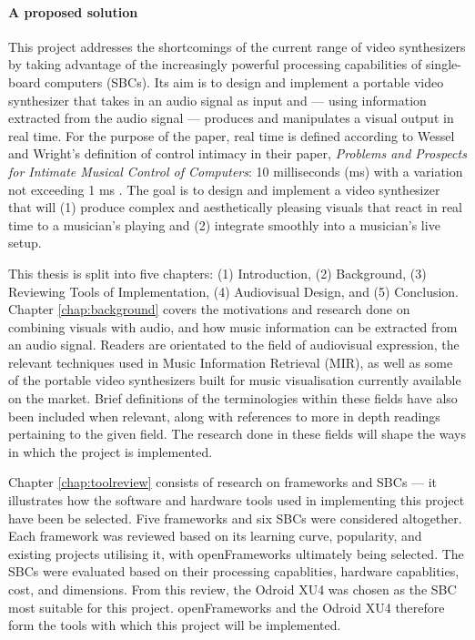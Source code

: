 \documentclass{report}
\begin{document}
\paragraph{A proposed solution}
This project addresses the shortcomings of the current range of video synthesizers by taking advantage of the increasingly powerful processing capabilities of single-board computers (SBCs). Its aim is to design and implement a portable video synthesizer that takes in an audio signal as input and --- using information extracted from the audio signal --- produces and manipulates a visual output in real time. For the purpose of the paper, real time is defined according to Wessel and Wright's definition of control intimacy in their paper, \textit{Problems and Prospects for Intimate Musical Control of Computers}: 10 milliseconds (ms) with a variation not exceeding 1 ms \cite{Wessel2002}. The goal is to design and implement a video synthesizer that will (1) produce complex and aesthetically pleasing visuals that react in real time to a musician's playing and (2) integrate smoothly into a musician's live setup. \par

This thesis is split into five chapters: (1) Introduction, (2) Background, (3) Reviewing Tools of Implementation, (4) Audiovisual Design, and (5) Conclusion. Chapter \ref{chap:background} covers the motivations and research done on combining visuals with audio, and how music information can be extracted from an audio signal. Readers are orientated to the field of audiovisual expression, the relevant techniques used in Music Information Retrieval (MIR), as well as some of the portable video synthesizers built for music visualisation currently available on the market. Brief definitions of the terminologies within these fields have also been included when relevant, along with references to more in depth readings pertaining to the given field. The research done in these fields will shape the ways in which the project is implemented. \par

Chapter \ref{chap:toolreview} consists of research on frameworks and SBCs --- it illustrates how the software and hardware tools used in implementing this project have been be selected. Five frameworks and six SBCs were considered altogether. Each framework was reviewed based on its learning curve, popularity, and existing projects utilising it, with openFrameworks ultimately being selected. The SBCs were evaluated based on their processing capablities, hardware capablities, cost, and dimensions. From this review, the Odroid XU4 was chosen as the SBC most suitable for this project. openFrameworks and the Odroid XU4 therefore form the tools with which this project will be implemented. \par
\end{document}
